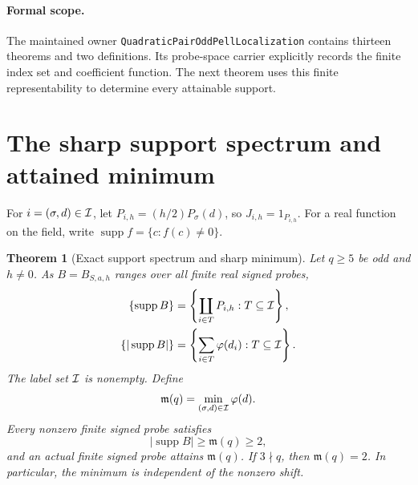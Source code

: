 \documentclass[11pt]{article}
\newtheorem{theorem}{Theorem}[section]
\begin{document}
\paragraph{Formal scope.}
The maintained owner \texttt{QuadraticPairOddPellLocalization}
contains thirteen theorems and two definitions.
Its probe-space carrier explicitly records the finite index set
and coefficient function. The next theorem uses this finite
representability to determine every attainable support.

\section{The sharp support spectrum and attained minimum}
\label{sec:odd-pell-support-spectrum}

For \(i=(\sigma,d)\in{\cal I}\), let
\(P_{i,h}=(h/2)P_\sigma(d)\), so \(J_{i,h}=1_{P_{i,h}}\).
For a real function on the field, write
\(\operatorname{supp} f=\{c:f(c)\ne0\}\).

\begin{theorem}[Exact support spectrum and sharp minimum]
\label{thm:odd-pell-support-spectrum}
Let \(q\ge5\) be odd and \(h\ne0\).
As \(B=B_{S,a,h}\) ranges over all finite real signed probes,
\begin{align*}
 \{\operatorname{supp} B\}
   &=\left\{\coprod_{i\in T}P_{i,h}:T\subseteq{\cal I}\right\},\\
 \{|\operatorname{supp} B|\}
   &=\left\{\sum_{i\in T}\varphi(d_i):T\subseteq{\cal I}\right\}.
\end{align*}
The label set \({\cal I}\) is nonempty. Define
\[
             \mathfrak m(q)=\min_{(\sigma,d)\in{\cal I}}\varphi(d).
\]
Every nonzero finite signed probe satisfies
\[
                  |\operatorname{supp} B|\ge\mathfrak m(q)\ge2,
\]
and an actual finite signed probe attains \(\mathfrak m(q)\).
If \(3\nmid q\), then \(\mathfrak m(q)=2\).
In particular, the minimum is independent of the nonzero shift.
\end{theorem}
\end{document}
